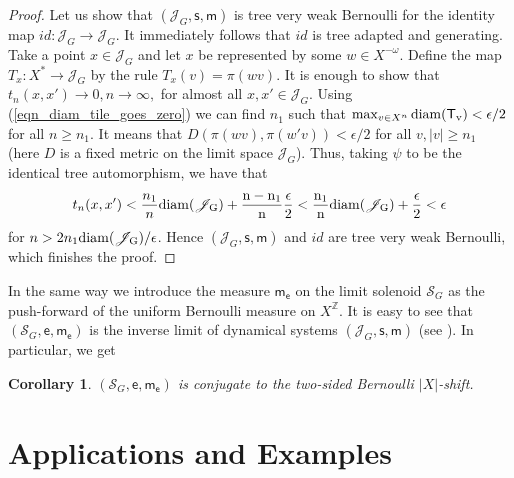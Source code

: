 \documentclass[12pt]{article}
\newcommand{\xmo}{X^{-\omega}}
\newcommand{\xz}{X^{\mathbb{Z}}}
\newcommand{\sol}[1][G]{\mathcal{S}_{#1}}
\newcommand{\lims}[1][G]{\mathscr{J}_{#1}}
\newcommand{\si}{\mathsf{s}}
\newcommand{\e}{\mathsf{e}}
\newcommand{\muls}{\mathsf{m}}
\newcommand{\T}{\mathsf{T}}
\newtheorem{cor}[theor]{Corollary}
\newtheorem{lemma}{Lemma}
\theoremstyle{definition}
\begin{document}
\begin{proof}
Let us show that $(\lims,\si,\muls)$ is tree very weak Bernoulli for the identity map
$id:\lims\rightarrow\lims$. It immediately follows that $id$ is tree adapted and generating. Take a
point $x\in\lims$ and let $x$ be represented by some $w\in\xmo$. Define the map
$T_x:X^{*}\rightarrow\lims$ by the rule $T_x(v)=\pi(wv)$. It is enough to show that $
t_n(x,x')\rightarrow 0, n\rightarrow\infty, $ for almost all $x,x'\in\lims$. Using
(\ref{eqn_diam_tile_goes_zero}) we can find $n_1$ such that $\max_{v\in
X^n}\rm{diam}(\T_v)<\epsilon/2$ for all $n\geq n_1$. It means that $D(\pi(wv),\pi(w'v))<\epsilon/2$
for all $v,|v|\geq n_1$ (here $D$ is a fixed metric on the limit space $\lims$). Thus, taking
$\psi$ to be the identical tree automorphism, we have that
\[
t_n(x,x')<\frac{n_1}{n} \rm{diam}(\lims)+\frac{n-n_1}{n}\frac{\epsilon}{2}<\frac{n_1}{n}
\rm{diam}(\lims)+\frac{\epsilon}{2}<\epsilon
\]
for $n>2n_1\rm{diam}(\lims)/\epsilon$. Hence $(\lims,\si,\muls)$ and $id$ are tree very weak
Bernoulli, which finishes the proof.
\end{proof}







In the same way we introduce the measure $\muls_\e$ on the limit solenoid $\sol$ as the
push-forward of the uniform Bernoulli measure on $\xz$. It is easy to see that $(\sol,\e,\muls_\e)$
is the inverse limit of dynamical systems $(\lims,\si,\muls)$ (see \cite[page~27]{dyn_sysII}). In
particular, we get


\begin{cor}
$(\sol,\e,\muls_\e)$ is conjugate to the two-sided Bernoulli $|X|$-shift.
\end{cor}




\section{Applications and Examples}\label{section_Applictions}
\end{document}
